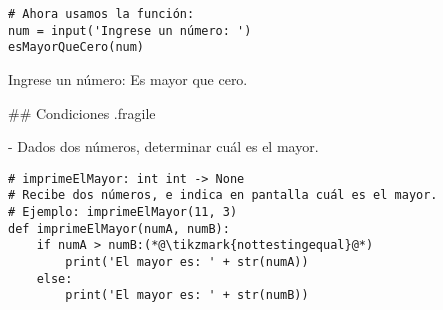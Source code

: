 \vspace{-3ex}

\pause

\vspace{-3ex}

\pause


\bgncolumns
{}
\vspace{-1ex}


\begin{lstlisting}
# Ahora usamos la función: 
num = input('Ingrese un número: ')
esMayorQueCero(num)
\end{lstlisting}

\vspace{-1ex}


\begin{exampleConsole}
Ingrese un número: 
Es mayor que cero.
\end{exampleConsole}

\trmcolumns

## Condiciones {.fragile}


\vspace{-3ex}

- Dados dos números, determinar cuál es el mayor.

\vspace{-1ex}
\begin{lstlisting}
# imprimeElMayor: int int -> None
# Recibe dos números, e indica en pantalla cuál es el mayor.
# Ejemplo: imprimeElMayor(11, 3)
def imprimeElMayor(numA, numB):
    if numA > numB:(*@\tikzmark{nottestingequal}@*)
        print('El mayor es: ' + str(numA))
    else:
        print('El mayor es: ' + str(numB))
\end{lstlisting}

\vspace{-2ex}

\bgncolumns
{}

